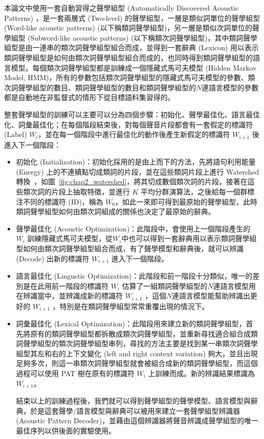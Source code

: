本論文中使用一套自動習得之聲學組型 (Automatically Discovered Acoustic Patterns) ，是一套兩層式 (Two-level) 的聲學組型，一層是類似詞單位的聲學組型 (Word-like acoustic patterns) (以下稱類詞聲學組型)，另一層是類似次詞單位的聲學組型 (Subword-like acoustic patterns) (以下稱類次詞聲學組型)，其中類詞聲學組型是由一連串的類次詞聲學組型組合而成，並得到一套辭典 (Lexicon) 用以表示類詞聲學組型是如何由類次詞聲學組型組合而成的，也同時得到類詞聲學組型的語言模型。每個類次詞聲學組型都是訓練成一個隱藏式馬可夫模型 (Hidden Markov Model, HMM)，所有的參數包括類次詞聲學組型的隱藏式馬可夫模型的參數、類次詞聲學組型的數目、類詞聲學組型的數目和類詞聲學組型的$N$連語言模型的參數都是自動地在非監督式的情形下從目標語料集習得的。

整套聲學組型的訓練可以主要可以分為四個步驟：初始化、聲學最佳化、語言最佳化、詞彙最佳化；在每個階段結束後，對每個聲音片段都會有一套假定的標識符 (Label) $W_i$，並在每一個階段中進行最佳化的動作後產生新假定的標識符 $W_{i+1}$ 後進入下一個階段：
\begin{itemize}
\itemsep -2pt %
  \item  初始化 (Initialization)：初始化採用的是由上而下的方法，先將語句利用能量 (Energy) 上的不連續點切成類詞的片段，並在這些類詞片段上進行 Watershed 轉換~\cite{DBLP:conf/interspeech/JansenCH10}，如圖~\ref{fig:chap2_watershed}，將其切成數個類次詞的片段。接著在這些類次詞的片段上抽取特徵，並進行 $K$ 平均分群演算法，之後給每一個群標注不同的標識符 (ID)，稱為 $W_0$，如此一來即可得到最原始的聲學組型，此時類詞聲學組型如何由類次詞組成的關係也決定了最原始的辭典。
  \item  聲學最佳化 (Acoustic Optimization)：此階段中，會使用上一個階段產生的 $W_i$ 訓練隱藏式馬可夫模型，從$W_i$中也可以得到一套辭典用以表示類詞聲學組型如何由類次詞聲學組型組合而成，有了聲學模型和辭典後，就可以辨識 (Decode) 出新的標識符 $W_{i+1}$ 進入下一個階段。
  \item  語言最佳化 (Lingustic Optimization)：此階段和前一階段十分類似，唯一的差別是在此用前一階段的標識符 $W_i$ 估算了一組類詞聲學組型的$N$連語言模型用在辨識當中，並辨識成新的標識符 $W_{i+1}$ ，這個$N$連語言模型能幫助辨識出更好的 $W_{i+1}$ ，特別是在類詞聲學組型常常重覆出現的情況下。
  \item  詞彙最佳化 (Lexical Optimization)：此階段用來建立新的類詞聲學組型，首先將原有的類詞聲學組型都拆散成類次詞聲學組型，並重新尋找適合組合成類詞聲學組型的類次詞聲學組型串列，尋找的方法主要是找到某一串類次詞聲學組型其左和右的上下文變化 (left and right context variation) 夠大，並且出現足夠多次，則這一串類次詞聲學組型就會被組合成新的類詞聲學組型，而這個過程可以使用 PAT 樹在原有的標識符 $W_i$ 上訓練而成。新的辨識結果標識為 $W_{i+1}$。

結束以上的訓練過程後，我們就可以得到聲學組型的聲學模型、語言模型與辭典，於是這套聲學/語言模型與辭典可以被用來建立一套聲學組型辨識器 (Acoustic Pattern Decoder)，並藉由這個辨識器將聲音辨識成聲學組型的唯一最佳序列以供後面的實驗使用。

\end{itemize}

